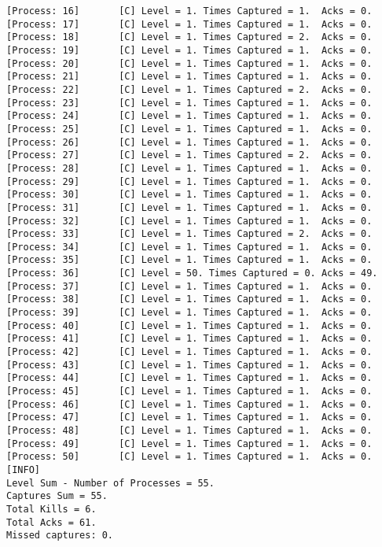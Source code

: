 \begin{Verbatim}[commandchars=\\\{\},codes={\catcode`$=3\catcode`_=8},frame=single,label=Test 6 output]
[Process: 16]       [C]	Level = 1. Times Captured = 1.	Acks = 0.
[Process: 17]       [C]	Level = 1. Times Captured = 1.	Acks = 0.
[Process: 18]       [C]	Level = 1. Times Captured = 2.	Acks = 0.
[Process: 19]       [C]	Level = 1. Times Captured = 1.	Acks = 0.
[Process: 20]       [C]	Level = 1. Times Captured = 1.	Acks = 0.
[Process: 21]       [C]	Level = 1. Times Captured = 1.	Acks = 0.
[Process: 22]       [C]	Level = 1. Times Captured = 2.	Acks = 0.
[Process: 23]       [C]	Level = 1. Times Captured = 1.	Acks = 0.
[Process: 24]       [C]	Level = 1. Times Captured = 1.	Acks = 0.
[Process: 25]       [C]	Level = 1. Times Captured = 1.	Acks = 0.
[Process: 26]       [C]	Level = 1. Times Captured = 1.	Acks = 0.
[Process: 27]       [C]	Level = 1. Times Captured = 2.	Acks = 0.
[Process: 28]       [C]	Level = 1. Times Captured = 1.	Acks = 0.
[Process: 29]       [C]	Level = 1. Times Captured = 1.	Acks = 0.
[Process: 30]       [C]	Level = 1. Times Captured = 1.	Acks = 0.
[Process: 31]       [C]	Level = 1. Times Captured = 1.	Acks = 0.
[Process: 32]       [C]	Level = 1. Times Captured = 1.	Acks = 0.
[Process: 33]       [C]	Level = 1. Times Captured = 2.	Acks = 0.
[Process: 34]       [C]	Level = 1. Times Captured = 1.	Acks = 0.
[Process: 35]       [C]	Level = 1. Times Captured = 1.	Acks = 0.
[Process: 36]       [C]	Level = 50. Times Captured = 0.	Acks = 49.
[Process: 37]       [C]	Level = 1. Times Captured = 1.	Acks = 0.
[Process: 38]       [C]	Level = 1. Times Captured = 1.	Acks = 0.
[Process: 39]       [C]	Level = 1. Times Captured = 1.	Acks = 0.
[Process: 40]       [C]	Level = 1. Times Captured = 1.	Acks = 0.
[Process: 41]       [C]	Level = 1. Times Captured = 1.	Acks = 0.
[Process: 42]       [C]	Level = 1. Times Captured = 1.	Acks = 0.
[Process: 43]       [C]	Level = 1. Times Captured = 1.	Acks = 0.
[Process: 44]       [C]	Level = 1. Times Captured = 1.	Acks = 0.
[Process: 45]       [C]	Level = 1. Times Captured = 1.	Acks = 0.
[Process: 46]       [C]	Level = 1. Times Captured = 1.	Acks = 0.
[Process: 47]       [C]	Level = 1. Times Captured = 1.	Acks = 0.
[Process: 48]       [C]	Level = 1. Times Captured = 1.	Acks = 0.
[Process: 49]       [C]	Level = 1. Times Captured = 1.	Acks = 0.
[Process: 50]       [C]	Level = 1. Times Captured = 1.	Acks = 0.
[INFO]		
Level Sum - Number of Processes = 55.	
Captures Sum = 55.	
Total Kills = 6.	
Total Acks = 61.
Missed captures: 0.	
	
	\end{Verbatim}

	\vspace{10pt}